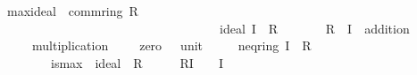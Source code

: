 \documentclass[12pt]{scrartcl}
\begin{document}
\begin{isabelle}
\isamarkupfalse%
\ max{\isacharunderscore}{\kern0pt}ideal\ {\isacharequal}{\kern0pt}\ comm{\isacharunderscore}{\kern0pt}ring\ R\ {\isachardoublequoteopen}{\isacharparenleft}{\kern0pt}{\isacharplus}{\kern0pt}{\isacharparenright}{\kern0pt}{\isachardoublequoteclose}\ {\isachardoublequoteopen}{\isacharparenleft}{\kern0pt}{\isasymcdot}{\isacharparenright}{\kern0pt}{\isachardoublequoteclose}\ {\isachardoublequoteopen}{\isasymzero}{\isachardoublequoteclose}\ {\isachardoublequoteopen}{\isasymone}{\isachardoublequoteclose}\ \isanewline
\ \ \ \ \ \ \ \ \ \ \ \ \ \ \ \ \ \ \ \ \ \ \ \ \ \ \ \ \ \ \ \ \ \ {\isacharplus}{\kern0pt}\ ideal\ I\ \ R\ {\isachardoublequoteopen}{\isacharparenleft}{\kern0pt}{\isacharplus}{\kern0pt}{\isacharparenright}{\kern0pt}{\isachardoublequoteclose}\ {\isachardoublequoteopen}{\isacharparenleft}{\kern0pt}{\isasymcdot}{\isacharparenright}{\kern0pt}{\isachardoublequoteclose}\ {\isachardoublequoteopen}{\isasymzero}{\isachardoublequoteclose}\ {\isachardoublequoteopen}{\isasymone}{\isachardoublequoteclose}\isanewline
\ \ \ R\ \ I\ \ addition\ {\isacharparenleft}{\kern0pt}\ {\isachardoublequoteopen}{\isacharplus}{\kern0pt}{\isachardoublequoteclose}\ {}{}{\isacharparenright}{\kern0pt}\ \isanewline
\ \ \ \ \ multiplication\ {\isacharparenleft}{\kern0pt}\ {\isachardoublequoteopen}{\isasymcdot}{\isachardoublequoteclose}\ {}{}{\isacharparenright}{\kern0pt}\ \ zero\ {\isacharparenleft}{\kern0pt}{\isachardoublequoteopen}{\isasymzero}{\isachardoublequoteclose}{\isacharparenright}{\kern0pt}\ \ unit\ {\isacharparenleft}{\kern0pt}{\isachardoublequoteopen}{\isasymone}{\isachardoublequoteclose}{\isacharparenright}{\kern0pt}\ {\isacharplus}{\kern0pt}\isanewline
\ \ \ neq{\isacharunderscore}{\kern0pt}ring{\isacharcolon}{\kern0pt}\ {\isachardoublequoteopen}I\ {\isasymnoteq}\ R{\isachardoublequoteclose}\ \isanewline
\ \ \ \ \ \ \ \ is{\isacharunderscore}{\kern0pt}max{\isacharcolon}{\kern0pt}\ {\isachardoublequoteopen}{\isasymAnd}{\isasymaa}{\isachardot}{\kern0pt}\ {\isasymlbrakk}ideal\ {\isasymaa}\ R\ {\isacharparenleft}{\kern0pt}{\isacharplus}{\kern0pt}{\isacharparenright}{\kern0pt}\ {\isacharparenleft}{\kern0pt}{\isasymcdot}{\isacharparenright}{\kern0pt}\ {\isasymzero}\ {\isasymone}{\isacharsemicolon}{\kern0pt}{\isasymaa}\ {\isasymnoteq}\ R{\isacharsemicolon}{\kern0pt}I\ {\isasymsubseteq}\ {\isasymaa}\ {\isasymrbrakk}{\isasymLongrightarrow}\ I\ {\isacharequal}{\kern0pt}\ {\isasymaa}{\isachardoublequoteclose}
\end{isabelle}
\end{document}
